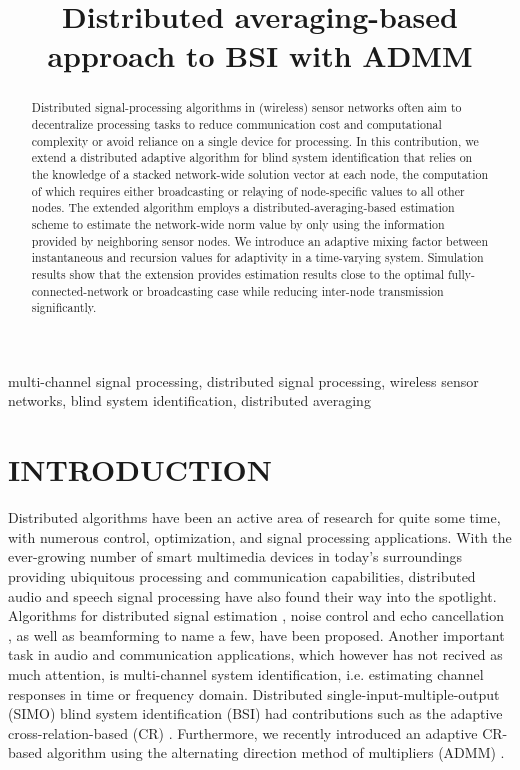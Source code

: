 \documentclass{article}
\title{Distributed averaging-based approach to BSI with ADMM}
\begin{document}
\ninept
%
\maketitle
%
\begin{abstract}
    Distributed signal-processing algorithms in (wireless) sensor networks often aim to decentralize processing tasks to reduce communication cost and computational complexity or avoid reliance on a single device for processing.
    In this contribution, we extend a distributed adaptive algorithm for blind system identification that relies on the knowledge of a stacked network-wide solution vector at each node, the computation of which requires either broadcasting or relaying of node-specific values to all other nodes.
    The extended algorithm employs a distributed-averaging-based estimation scheme to estimate the network-wide norm value by only using the information provided by neighboring sensor nodes.
    We introduce an adaptive mixing factor between instantaneous and recursion values for adaptivity in a time-varying system.
    Simulation results show that the extension provides estimation results close to the optimal fully-connected-network or broadcasting case while reducing inter-node transmission significantly.
\end{abstract}
%
\begin{keywords}
multi-channel signal processing, distributed signal processing, wireless sensor networks, blind system identification, distributed averaging
\end{keywords}
%
\section{INTRODUCTION}
\label{sec:intro}

Distributed algorithms have been an active area of research for quite some time, with numerous control, optimization, and signal processing applications.
With the ever-growing number of smart multimedia devices in today's surroundings providing ubiquitous processing and communication capabilities, distributed audio and speech signal processing have also found their way into the spotlight.
Algorithms for distributed signal estimation \cite{5483092}, noise control and echo cancellation \cite{9670697}, as well as beamforming \cite{6663655,6329934,MARKOVICHGOLAN20154} to name a few, have been proposed.
Another important task in audio and communication applications, which however has not recived as much attention, is multi-channel system identification, i.e. estimating channel responses in time or frequency domain.
Distributed single-input-multiple-output (SIMO) blind system identification (BSI) had contributions such as the adaptive cross-relation-based (CR) \cite{yuDistributedBlindSystem2014, liuDistributedBlindIdentification2016}.
Furthermore, we recently introduced an adaptive CR-based algorithm \cite{blochbergerDBSI} using the alternating direction method of multipliers (ADMM) \cite{boydDistributedOptimizationStatistical2011}.
\end{document}
